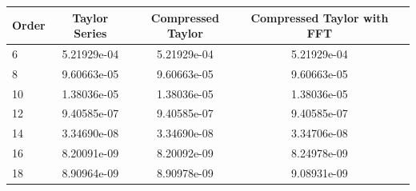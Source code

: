   \begin{tabular}{lcccc} \toprule
    Order  & Taylor Series & Compressed Taylor & Compressed Taylor with FFT \\ \midrule
    6 & 5.21929e-04 & 5.21929e-04 & 5.21929e-04 \\
    8 & 9.60663e-05 & 9.60663e-05 & 9.60663e-05 \\
    10 & 1.38036e-05 & 1.38036e-05 & 1.38036e-05 \\
    12 & 9.40585e-07 & 9.40585e-07 & 9.40585e-07 \\
    14 & 3.34690e-08 & 3.34690e-08 & 3.34706e-08 \\
    16 & 8.20091e-09 & 8.20092e-09 & 8.24978e-09 \\
    18 & 8.90964e-09 & 8.90978e-09 & 9.08931e-09 \\  \bottomrule
  \end{tabular}
